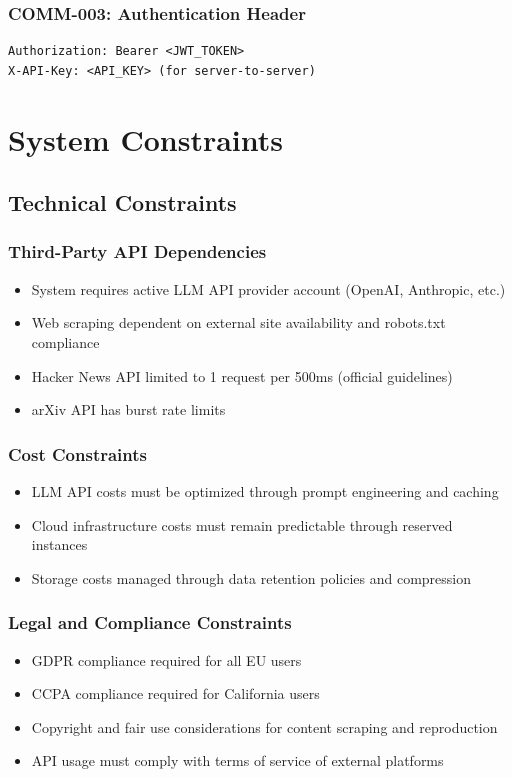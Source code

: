 \documentclass{report}
\begin{document}
\subsection{COMM-003: Authentication Header}
\begin{lstlisting}
Authorization: Bearer <JWT_TOKEN>
X-API-Key: <API_KEY> (for server-to-server)
\end{lstlisting}

\chapter{System Constraints}

\section{Technical Constraints}

\subsection{Third-Party API Dependencies}
\begin{itemize}
    \item System requires active LLM API provider account (OpenAI, Anthropic, etc.)
    \item Web scraping dependent on external site availability and robots.txt compliance
    \item Hacker News API limited to 1 request per 500ms (official guidelines)
    \item arXiv API has burst rate limits
\end{itemize}

\subsection{Cost Constraints}
\begin{itemize}
    \item LLM API costs must be optimized through prompt engineering and caching
    \item Cloud infrastructure costs must remain predictable through reserved instances
    \item Storage costs managed through data retention policies and compression
\end{itemize}

\subsection{Legal and Compliance Constraints}
\begin{itemize}
    \item GDPR compliance required for all EU users
    \item CCPA compliance required for California users
    \item Copyright and fair use considerations for content scraping and reproduction
    \item API usage must comply with terms of service of external platforms
\end{itemize}
\end{document}
